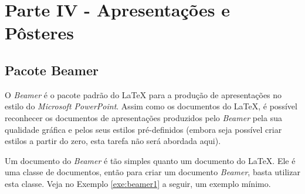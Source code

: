 \chapter{Parte IV - Apresentações e Pôsteres}
\label{cap:parteIV}

\section{Pacote Beamer}
\label{sec:beamer}

O \textit{Beamer} é o pacote padrão do \LaTeX{} para a produção de apresentações no estilo do \textit{Microsoft PowerPoint}. Assim como os documentos do \LaTeX{}, é possível reconhecer os documentos de apresentações produzidos pelo \textit{Beamer} pela sua qualidade gráfica e pelos seus estilos pré-definidos (embora seja possível criar estilos a partir do zero, esta tarefa não será abordada aqui).

Um documento do \textit{Beamer} é tão simples quanto um documento do \LaTeX{}. Ele é uma classe de documentos, então para criar um documento \textit{Beamer}, basta utilizar esta classe. Veja no Exemplo \ref{exe:beamer1} a seguir, um exemplo mínimo.


